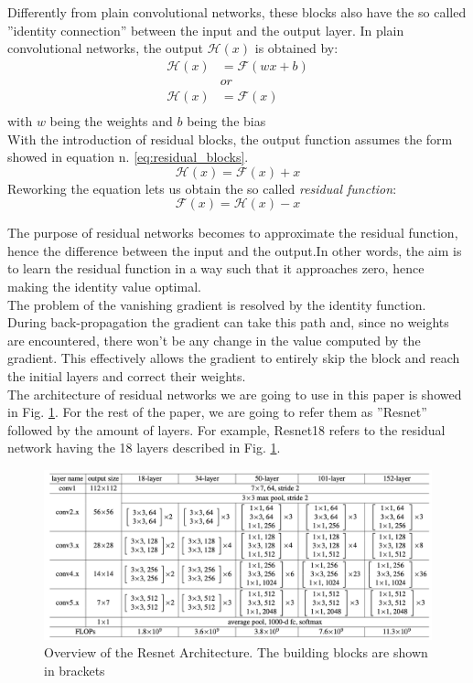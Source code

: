 Differently from plain convolutional networks, these blocks also have the so called ''identity connection'' between the input and the output layer. 
In plain convolutional networks, the output $\mathcal{H}(x)$ is obtained by:
\begin{align*}
\mathcal{H}(x) &= \mathcal{F}(wx + b)\\
               &or\\
\mathcal{H}(x) &= \mathcal{F}(x)\\   
\end{align*}
with $w$ being the weights and $b$ being the bias\\
With the introduction of residual blocks, the output function assumes the form showed in equation n. \ref{eq:residual_blocks}.
\begin{equation}
\mathcal{H}(x) = \mathcal{F}(x) + x
\label{eq:residual_blocks}   
\end{equation}
Reworking the equation lets us obtain the so called \textit{residual function}: 
\begin{equation}
\mathcal{F}(x) = \mathcal{H}(x) - x
\label{eq:residual_function}   
\end{equation}

The purpose of residual networks becomes to approximate the residual function, hence the difference between the input and the output.In other words, the aim is to learn the residual function in a way such that it approaches zero, hence making the identity value optimal. \\
The problem of the vanishing gradient is resolved by the identity function. During back-propagation the gradient can take this path and, since no weights are encountered, there won't be any change in the value computed by the gradient. This effectively allows the gradient to entirely skip the block and reach the initial layers and correct their weights. \\
The architecture of residual networks we are going to use in this paper is showed in Fig. \ref{fig:resnet_arch}. For the rest of the paper, we are going to refer them as ''Resnet'' followed by the amount of layers. For example, Resnet18 refers to the residual network having the 18 layers described in Fig.  \ref{fig:resnet_arch}. 
\begin{figure}[t]
    \centering
    \includegraphics[scale = 0.5]{img/resnet_arch.png}
    \caption[Overview of the Resnet Architecture]{Overview of the Resnet Architecture. The building blocks are shown in brackets \cite{DBLP:journals/corr/HeZRS15}}
    \label{fig:resnet_arch}
\end{figure}


